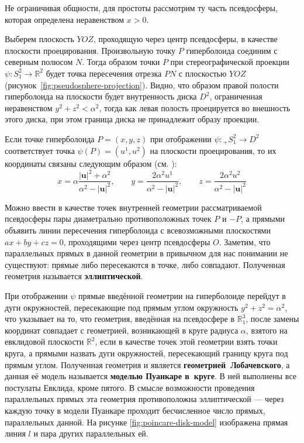 \documentclass{article}
\numberwithin{equation}{section}
\newcommand{\neword}[1]{\textbf{#1}}
\renewcommand{\vec}{\mathbf}
\providecommand{\abs}[1]{\left \lvert{#1}\right \rvert}
\begin{document}
Не ограничивая общности, для простоты рассмотрим ту часть псевдосферы,
которая определена неравенством $x>0$.

Выберем плоскость $YOZ$, проходящую через центр псевдосферы, в
качестве плоскости проецирования. Произвольную точку $P$ гиперболоида
соединим с северным полюсом $N$. Тогда образом точки $P$ при
стереографической проекции $\psi \colon S^2_1 \to \mathbb{R}^2$ будет
точка пересечения отрезка $PN$ с плоскостью $YOZ$
(рисунок \ref{fig:pseudosphere-projection}). Видно, что образом правой
полости гиперболоида на плоскости будет внутренность диска $D^2$,
ограниченная неравенством $y^2 + z^2 < \alpha^2$, тогда как левая
полость проецируется во внешность этого диска, при этом граница диска
не принадлежит образу проекции.

Если точке гиперболоида $P = (x, y, z)$ при отображении $\psi \colon
{}_+S^2_1 \to D^2$ соответствует точка $\psi(P) = (u^1, u^2)$ на
плоскости проецирования, то их координаты связаны следующим образом
(см. \cite{fomenko00}):
\begin{equation}\label{eq:hyperboloid-to-plane}
  x = \alpha\frac{\abs{\vec{u}}^2 + \alpha^2}{\alpha^2 -
    \abs{\vec{u}}^2}, \qquad
  y = \frac{2 \alpha^2 u^1}{\alpha^2 - \abs{\vec{u}}^2}, \qquad
  z = \frac{2 \alpha^2 u^2}{\alpha^2 - \abs{\vec{u}}^2}
\end{equation}

Можно ввести в качестве точек внутренней геометрии рассматриваемой
псевдосферы пары диаметрально противоположных точек $P$ и $-P$, а
прямыми объявить линии пересечения гиперболоида с всевозможными
плоскостями $ax+by+cz=0$, проходящими через центр псевдосферы $O$.
Заметим, что параллельных прямых в данной геометрии в привычном для
нас понимании не существуют: прямые либо пересекаются в точке, либо
совпадают. Полученная геометрия называется \neword{эллиптической}.

При отображении $\psi$ прямые введённой геометрии на гиперболоиде
перейдут в дуги окружностей, пересекающие под прямым углом окружность
$y^2 + z^2 = \alpha^2$, что указывает на то, что геометрия, введённая
на псевдосфере в $\mathbb{R}^3_1$, после замены координат совпадает с
геометрией, возникающей в круге радиуса $\alpha$, взятого на
евклидовой плоскости $\mathbb{R}^2$, если в качестве точек этой
геометрии взять точки круга, а прямыми назвать дуги окружностей,
пересекающий границу круга под прямым углом. Полученная геометрия и
является \neword{геометрией Лобачевского}, а данная её модель
называется \neword{моделью Пуанкаре в круге}. В ней выполнены все
постулаты Евклида, кроме пятого. В смысле возможности проведения
параллельных прямых эта геометрия противоположна эллиптической — через
каждую точку в модели Пуанкаре проходит бесчисленное число прямых,
параллельных данной. На рисунке \ref{fig:poincare-disk-model}
изображена прямая линия $l$ и пара других параллельных ей.
\end{document}

